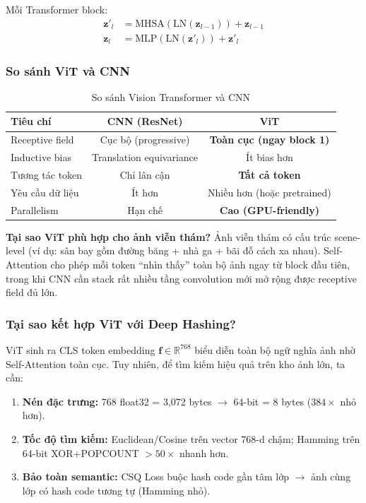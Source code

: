 \documentclass[13pt,a4paper]{article}
\newcommand{\R}{\mathbb{R}}
\begin{document}
Mỗi Transformer block:
\begin{align}
\mathbf{z}'_l &= \text{MHSA}(\text{LN}(\mathbf{z}_{l-1})) + \mathbf{z}_{l-1} \\
\mathbf{z}_l  &= \text{MLP}(\text{LN}(\mathbf{z}'_l)) + \mathbf{z}'_l
\end{align}

\subsubsection{So sánh ViT và CNN}

\begin{table}[H]
\centering
\caption{So sánh Vision Transformer và CNN}
\label{tab:vit_vs_cnn}
\begin{tabular}{lcc}
\toprule
\textbf{Tiêu chí} & \textbf{CNN (ResNet)} & \textbf{ViT} \\
\midrule
Receptive field     & Cục bộ (progressive) & \textbf{Toàn cục (ngay block 1)} \\
Inductive bias      & Translation equivariance & Ít bias hơn \\
Tương tác token     & Chỉ lân cận           & \textbf{Tất cả token} \\
Yêu cầu dữ liệu    & Ít hơn                & Nhiều hơn (hoặc pretrained) \\
Parallelism         & Hạn chế               & \textbf{Cao (GPU-friendly)} \\
\bottomrule
\end{tabular}
\end{table}

\textbf{Tại sao ViT phù hợp cho ảnh viễn thám?} Ảnh viễn thám có cấu trúc scene-level (ví dụ: sân bay gồm đường băng + nhà ga + bãi đỗ cách xa nhau). Self-Attention cho phép mỗi token ``nhìn thấy'' toàn bộ ảnh ngay từ block đầu tiên, trong khi CNN cần stack rất nhiều tầng convolution mới mở rộng được receptive field đủ lớn.

\subsubsection{Tại sao kết hợp ViT với Deep Hashing?}

ViT sinh ra CLS token embedding $\mathbf{f} \in \R^{768}$ biểu diễn toàn bộ ngữ nghĩa ảnh nhờ Self-Attention toàn cục. Tuy nhiên, để tìm kiếm hiệu quả trên kho ảnh lớn, ta cần:
\begin{enumerate}
    \item \textbf{Nén đặc trưng:} 768 float32 = 3{,}072 bytes $\to$ 64-bit = 8 bytes ($384\times$ nhỏ hơn).
    \item \textbf{Tốc độ tìm kiếm:} Euclidean/Cosine trên vector 768-d chậm; Hamming trên 64-bit XOR+POPCOUNT $>50\times$ nhanh hơn.
    \item \textbf{Bảo toàn semantic:} CSQ Loss buộc hash code gần tâm lớp $\to$ ảnh cùng lớp có hash code tương tự (Hamming nhỏ).
\end{enumerate}
\end{document}
